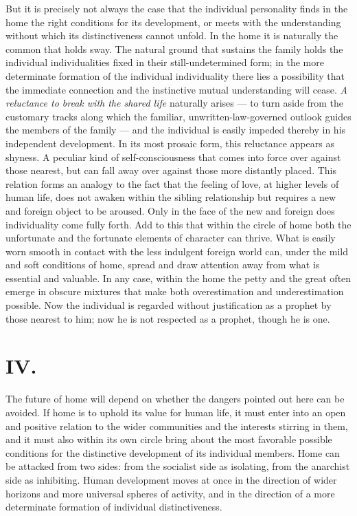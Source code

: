 \documentclass[12pt,a4paper]{article}
\newcommand{\opage}[1]{\marginnote{\footnotesize\textit{[#1]}}}
\begin{document}
But it is precisely not always the case that the individual personality
finds in the home the right conditions for its development, or meets
with the understanding without which its distinctiveness cannot unfold.
In the home it is naturally the common that holds sway. \opage{10}The natural
ground that sustains the family holds the individual individualities
fixed in their still-undetermined form; in the more determinate
formation of the individual individuality there lies a possibility that
the immediate connection and the instinctive mutual understanding
will cease. \emph{A reluctance to break with the shared life} naturally arises
--- to turn aside from the customary tracks along which the familiar,
unwritten-law-governed outlook guides the members of the family ---
and the individual is easily impeded thereby in his independent
development. In its most prosaic form, this reluctance appears as
shyness. A peculiar kind of self-consciousness that comes into force
over against those nearest, but can fall away over against those more
distantly placed. This relation forms an analogy to the fact that the
feeling of love, at higher levels of human life, does not awaken
within the sibling relationship but requires a new and foreign object
to be aroused. Only in the face of the new and foreign does
individuality come fully forth. Add to this that within the circle of
home both the unfortunate and the fortunate elements of character can
thrive. What is easily worn smooth in contact with the less
indulgent foreign world can, under the mild and soft conditions of
home, spread and draw attention away from what is essential and
valuable. In any case, within the home the petty and the great often
emerge in obscure mixtures that make both overestimation and
underestimation possible. Now the individual is regarded without
justification as a prophet by those nearest to him; now he is not
respected as a prophet, though he is one.

\section*{IV.}

\noindent The future of home will depend on whether the dangers
pointed out here can be avoided. If home is to uphold its value for
human life, it must enter into an open and positive relation to the
wider communities and the interests stirring in them, and it must
also within its own circle bring about the most favorable possible
conditions for the distinctive development of its individual members.
Home can be attacked from two sides: from the socialist side as
isolating, from the anarchist side as inhibiting. Human development
moves at once in the direction of wider horizons and more universal
spheres of activity, and in the direction of a more determinate
formation of individual distinctiveness.
\end{document}
